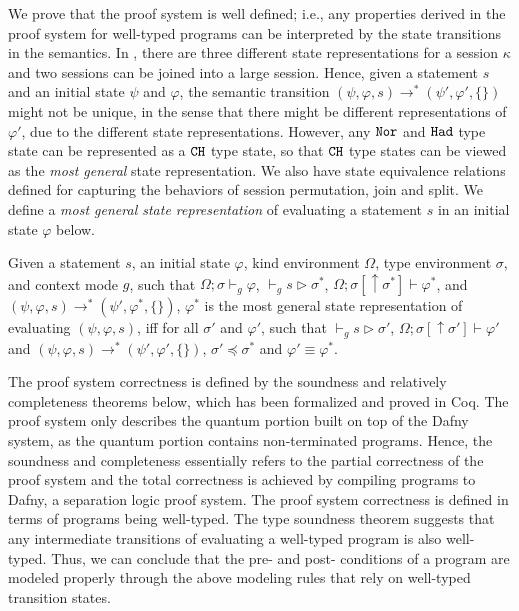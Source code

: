 We prove that the \qafny proof system is well defined; i.e., any properties derived in the \qafny proof system for well-typed \qafny programs can be interpreted by the state transitions in the \qafny semantics.
In \qafny, there are three different state representations for a session $\kappa$ and two sessions can be joined into a large session.
Hence, given a statement $s$ and an initial state $\psi$ and $\varphi$, the semantic transition $(\psi, \varphi,s) \longrightarrow^{*} (\psi',\varphi',\{\})$ might not be unique, in the sense that there might be different representations of $\varphi'$, due to the different state representations.
However, any $\texttt{Nor}$ and $\texttt{Had}$ type state can be represented as a $\texttt{CH}$ type state, so that $\texttt{CH}$ type states can be viewed as the \emph{most general} state representation. We also have state equivalence relations defined for capturing the behaviors of session permutation, join and split. We define a \emph{most general state representation} of evaluating a statement $s$ in an initial state $\varphi$ below.

\begin{definition}\label{def:most-gen}\rm 
  Given a statement $s$, an initial state $\varphi$, kind environment $\Omega$, type environment $\sigma$, and context mode $g$, such that $\Omega;\sigma\vdash_g \varphi$, $\vdash_g s \triangleright \sigma^*$, $\Omega;\sigma[\uparrow \sigma^*]\vdash \varphi^*$, and $(\psi,\varphi,s) \longrightarrow^{*} (\psi',\varphi^*,\{\})$, $\varphi^*$ is the most general state representation of evaluating $(\psi,\varphi,s)$, iff for all $\sigma'$ and $\varphi'$, such that $\vdash_g s \triangleright \sigma'$, $\Omega;\sigma[\uparrow \sigma']\vdash \varphi'$ and $(\psi,\varphi,s) \longrightarrow^{*} (\psi',\varphi',\{\})$, $\sigma' \preceq \sigma^*$ and $\varphi' \equiv \varphi^*$.
\end{definition}

The \qafny proof system correctness is defined by the soundness and relatively completeness theorems below, which has been formalized and proved in Coq. The \qafny proof system only describes the quantum portion built on top of the Dafny system, as the quantum portion contains non-terminated programs. Hence, the soundness and completeness essentially refers to the partial correctness of the \qafny proof system and the total correctness is achieved by compiling \qafny programs to Dafny, a separation logic proof system. The \qafny proof system correctness is defined in terms of programs being well-typed. The type soundness theorem suggests that any intermediate transitions of evaluating a well-typed \qafny program is also well-typed. Thus, we can conclude that the pre- and post- conditions of a program are modeled properly through the above modeling rules that rely on well-typed transition states.

